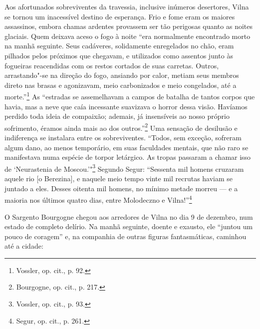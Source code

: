 Aos afortunados sobreviventes da travessia, inclusive inúmeros
desertores, Vilna se tornou um inacessível destino de esperança. Frio e
fome eram os maiores assassinos, embora chamas ardentes provassem ser
tão perigosas quanto as noites glaciais. Quem deixava aceso o fogo à
noite ``era normalmente encontrado morto na manhã seguinte. Seus
cadáveres, solidamente enregelados no chão, eram pilhados pelos próximos
que chegavam, e utilizados como assentos junto às fogueiras reacendidas
com os restos cortados de suas carretas. Outros, arrastando"-se na
direção do fogo, ansiando por calor, metiam seus membros direto nas
brasas e agonizavam, meio carbonizados e meio congelados, até a
morte.''\footnote{Vossler, op. cit., p. 92.} As ``estradas se
assemelhavam a campos de batalha de tantos corpos que havia, mas a neve
que caía incessante suavizava o horror dessa visão. Havíamos perdido
toda ideia de compaixão; ademais, já insensíveis ao nosso próprio
sofrimento, éramos ainda mais ao dos outros.''\footnote{Bourgogne, op.
  cit., p. 217.} Uma sensação de desilusão e indiferença se instalara
entre os sobreviventes. ``Todos, sem exceção, sofreram algum dano, ao
menos temporário, em suas faculdades mentais, que não raro se
manifestava numa espécie de torpor letárgico. As tropas passaram a
chamar isso de `Neurastenia de Moscou.'"\footnote{Vossler, op. cit., p. 93.} Segundo Segur: ``Sessenta mil homens cruzaram aquele rio {[}o Berezina{]}, e naquele meio tempo vinte mil recrutas haviam se juntado a
eles. Desses oitenta mil homens, no mínimo metade morreu --- e a maioria
nos últimos quatro dias, entre Molodeczno e Vilna!''\footnote{Segur, op. cit., p. 261.}
%

O Sargento Bourgogne chegou aos arredores de Vilna no dia 9 de dezembro,
num estado de completo delírio. Na manhã seguinte, doente e exausto, ele
``juntou um pouco de coragem'' e, na companhia de outras figuras
fantasmáticas, caminhou até a cidade:

